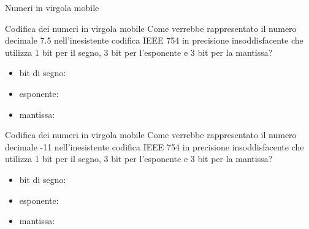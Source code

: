 \documentclass[11pt]{article}
\begin{document}
\begin{quiz}{Numeri in virgola mobile}
\begin{cloze}[points=1,shuffle=false]{Codifica dei numeri in virgola mobile}
Come verrebbe rappresentato il numero decimale 7.5 nell'inesistente codifica IEEE 754 in precisione
insoddisfacente che utilizza 1 bit per il segno, 3 bit per l'esponente e 3 bit per la mantissa?
\begin{itemize}
\item bit di segno: 
\item esponente:  
\item mantissa: 
\end{itemize}
\end{cloze}

\begin{cloze}[points=1,shuffle=false]{Codifica dei numeri in virgola mobile}
Come verrebbe rappresentato il numero decimale -11 nell'inesistente codifica IEEE 754 in precisione
insoddisfacente che utilizza 1 bit per il segno, 3 bit per l'esponente e 3 bit per la mantissa?
\begin{itemize}
\item bit di segno: 
\item esponente:  
\item mantissa: 
\end{itemize}
\end{cloze}


\end{quiz}
\end{document}
